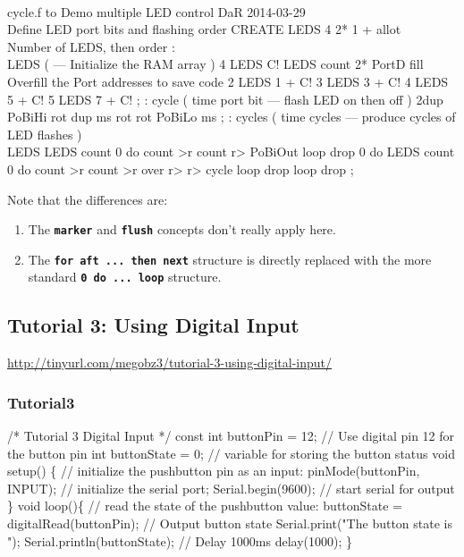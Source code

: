 \documentclass[10pt,english]{article}
\begin{document}
\nwenddocs{}\endmoddef
\\ cycle.f to Demo multiple LED control      DaR 2014-03-29
\\ Define LED port bits and flashing order
CREATE LEDS   4 2* 1 + allot \\ Number of LEDS, then order
: \\LEDS ( --- Initialize the RAM array )   4 LEDS C!
   LEDS count 2* PortD fill \\ Overfill the Port addresses to save code
   2 LEDS 1 + C!  3 LEDS 3 + C!  4 LEDS 5 + C!  5 LEDS 7 + C! ;
: cycle ( time port bit --- flash LED on then off )
   2dup PoBiHi  rot dup ms  rot rot PoBiLo  ms ;
: cycles ( time cycles --- produce cycles of LED flashes )   \\LEDS
   LEDS count 0 do  count >r count r> PoBiOut  loop  drop
   0 do  LEDS count 0 do  count >r count >r over r> r>
         cycle  loop  drop  loop  drop ;
\nwendcode{}\nwdocspar

Note that the differences are:
\begin{enumerate}
\item The \texttt{\textbf{marker}} and \texttt{\textbf{flush}} concepts
don't really apply here.
\item The \texttt{\textbf{for aft ... then next}} structure is directly
replaced with the more standard \texttt{\textbf{0 do ... loop}} structure.
\end{enumerate}

\subsection{Tutorial 3: Using Digital Input}

\url{http://tinyurl.com/megobz3/tutorial-3-using-digital-input/}


\subsubsection{Tutorial3}

\nwenddocs{}\endmoddef
/*
Tutorial 3 Digital Input
*/
const int buttonPin = 12;     // Use digital pin 12 for the button pin
int buttonState = 0;          // variable for storing the button status
void setup() \{
  // initialize the pushbutton pin as an input:
  pinMode(buttonPin, INPUT);
  // initialize the serial port;
  Serial.begin(9600);  // start serial for output 
\}
void loop()\{
  // read the state of the pushbutton value:
  buttonState = digitalRead(buttonPin);
  // Output button state
  Serial.print("The button state is ");
  Serial.println(buttonState);
  // Delay 1000ms
  delay(1000);
\}
\nwendcode{}\nwdocspar
\end{document}
